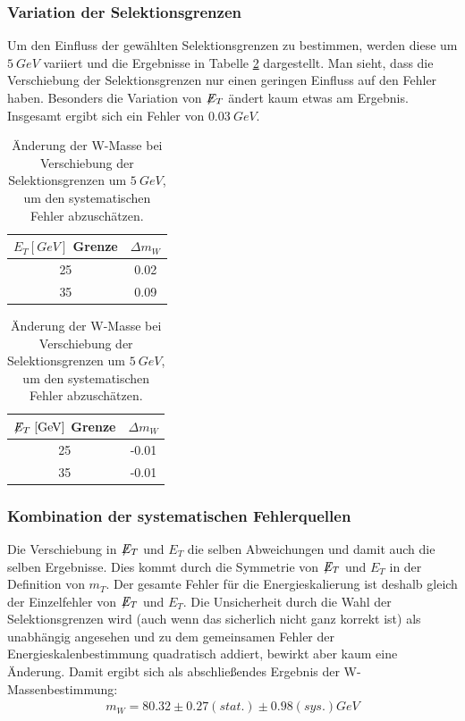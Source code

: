 \documentclass[a4paper,12pt]{article}
\newcommand{\met}{\ensuremath{\not\mathrel{E}}_T}
\begin{document}
\subsubsection*{Variation der Selektionsgrenzen}
Um den Einfluss der gewählten Selektionsgrenzen zu bestimmen, werden diese um $\SI{5}{GeV}$
variiert und die Ergebnisse in Tabelle \ref{tab:variation} dargestellt.
Man sieht, dass die Verschiebung der Selektionsgrenzen nur einen geringen Einfluss auf den Fehler
haben. Besonders die Variation von $\met$ ändert kaum etwas am Ergebnis. Insgesamt ergibt sich ein Fehler von $\SI{0.03}{GeV}$.
\begin{table}[h]
	\centering
	\begin{tabular}{c| c }
		$E_{T} [\si{GeV}]$ Grenze & $Δm_W$\\
		\hline
		25 & 0.02\\
		35 & 0.09
	\end{tabular}
	\hspace{2cm}
	\begin{tabular}{c|c}
		$\met [\si{GeV}]$ Grenze & $Δm_W$ \\
		\hline
		25 & -0.01 \\
		35 & -0.01
	\end{tabular}
	\caption{Änderung der W-Masse bei Verschiebung der Selektionsgrenzen um $\SI{5}{GeV}$, um den
systematischen Fehler abzuschätzen.}
	\label{tab:variation}
\end{table}

\subsubsection*{Kombination der systematischen Fehlerquellen}
Die Verschiebung in $\met$ und $E_T$ die selben Abweichungen und damit auch die selben Ergebnisse. Dies kommt durch die
Symmetrie von $\met$ und $E_T$ in der Definition von $m_T$.
Der gesamte Fehler für die Energieskalierung ist deshalb  gleich der Einzelfehler von $\met$ und
$E_T$. Die Unsicherheit durch die Wahl der Selektionsgrenzen wird (auch wenn das sicherlich nicht ganz korrekt ist)
als unabhängig angesehen und zu dem gemeinsamen Fehler der Energieskalenbestimmung quadratisch
addiert, bewirkt aber kaum eine Änderung. Damit ergibt sich als abschließendes Ergebnis der
W-Massenbestimmung:
\begin{align*}
	m_W =  80.32 ± 0.27 (stat.) ± 0.98 (sys.) \si{GeV}
\end{align*}
\FloatBarrier
\end{document}
